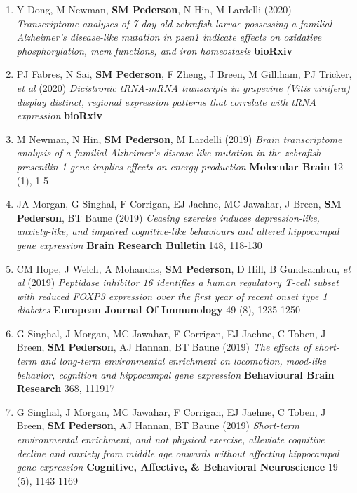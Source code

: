\documentclass[11pt,a4paper,]{moderncv}
\begin{document}
\begin{enumerate}
     \item Y Dong, M Newman, \textbf{SM Pederson}, N Hin, M Lardelli (2020) \emph{Transcriptome analyses of 7-day-old zebrafish larvae possessing a familial Alzheimer's disease-like mutation in psen1 indicate effects on oxidative phosphorylation, mcm functions, and iron homeostasis} \textbf{bioRxiv}  \\[-3mm] 
     \item PJ Fabres, N Sai, \textbf{SM Pederson}, F Zheng, J Breen, M Gilliham, PJ Tricker, \emph{et al} (2020) \emph{Dicistronic tRNA-mRNA transcripts in grapevine (Vitis vinifera) display distinct, regional expression patterns that correlate with tRNA expression} \textbf{bioRxiv}  \\[-3mm] 
     \item M Newman, N Hin, \textbf{SM Pederson}, M Lardelli (2019) \emph{Brain transcriptome analysis of a familial Alzheimer's disease-like mutation in the zebrafish presenilin 1 gene implies effects on energy production} \textbf{Molecular Brain} 12 (1), 1-5 \\[-3mm] 
     \item JA Morgan, G Singhal, F Corrigan, EJ Jaehne, MC Jawahar, J Breen, \textbf{SM Pederson}, BT Baune (2019) \emph{Ceasing exercise induces depression-like, anxiety-like, and impaired cognitive-like behaviours and altered hippocampal gene expression} \textbf{Brain Research Bulletin} 148, 118-130 \\[-3mm] 
     \item CM Hope, J Welch, A Mohandas, \textbf{SM Pederson}, D Hill, B Gundsambuu, \emph{et al} (2019) \emph{Peptidase inhibitor 16 identifies a human regulatory T-cell subset with reduced FOXP3 expression over the first year of recent onset type 1 diabetes} \textbf{European Journal Of Immunology} 49 (8), 1235-1250 \\[-3mm] 
     \item G Singhal, J Morgan, MC Jawahar, F Corrigan, EJ Jaehne, C Toben, J Breen, \textbf{SM Pederson}, AJ Hannan, BT Baune (2019) \emph{The effects of short-term and long-term environmental enrichment on locomotion, mood-like behavior, cognition and hippocampal gene expression} \textbf{Behavioural Brain Research} 368, 111917 \\[-3mm] 
     \item G Singhal, J Morgan, MC Jawahar, F Corrigan, EJ Jaehne, C Toben, J Breen, \textbf{SM Pederson}, AJ Hannan, BT Baune (2019) \emph{Short-term environmental enrichment, and not physical exercise, alleviate cognitive decline and anxiety from middle age onwards without affecting hippocampal gene expression} \textbf{Cognitive, Affective, \& Behavioral Neuroscience} 19 (5), 1143-1169 \\[-3mm] 

\end{enumerate}
\end{document}

